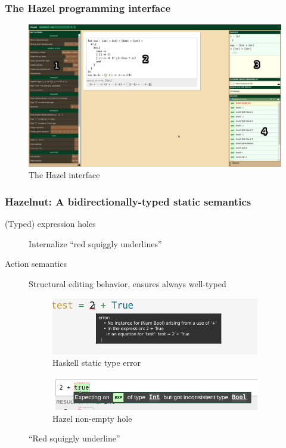\documentclass{beamer}
\begin{document}
\begin{frame}
  \frametitle{The Hazel programming interface}

  \begin{figure}
    \centering
    \includegraphics[width=.9\linewidth]{thesis/img/hazel_ui_annot.png}
    \caption{The Hazel interface}
    \label{fig:hazel-ui}
  \end{figure}

\end{frame}

\begin{frame}
  \frametitle{Hazelnut: A bidirectionally-typed static semantics}

  \begin{description}
  \item[(Typed) expression holes] Internalize ``red squiggly underlines'' \cite{conf/popl/Hazelnut17}
  \item[Action semantics] Structural editing behavior, ensures always well-typed
  \end{description}

  \begin{figure}
    \centering
    \begin{subfigure}[b]{0.45\textwidth}
      \includegraphics[width=\textwidth]{thesis/img/haskell_squiggle}
      \caption{Haskell static type error}
    \end{subfigure}
    \qquad
    \begin{subfigure}[b]{0.45\textwidth}
      \includegraphics[width=\textwidth]{thesis/img/hazel_squiggle}
      \caption{Hazel non-empty hole}
    \end{subfigure}
    \caption{``Red squiggly underline''}
    \label{fig:hazelnut-action-sequence}
  \end{figure}
\end{frame}
\end{document}
